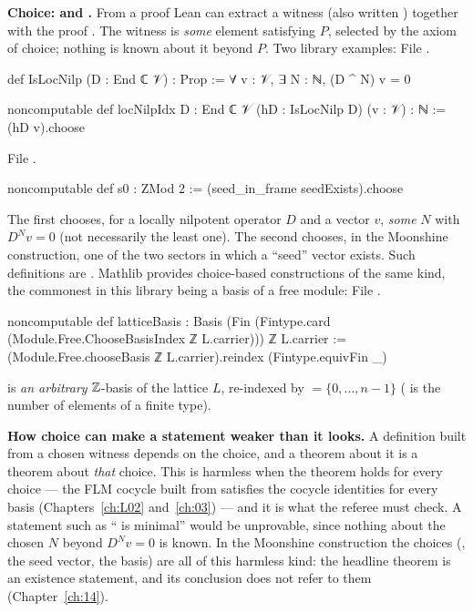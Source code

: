 \textbf{Choice:  and .} From a proof 
Lean can extract a witness  (also written ) together with
the proof . The witness is \emph{some} element satisfying $P$,
selected by the axiom of choice; nothing is known about it beyond $P$. Two library examples:
\noindent File .
\begin{leancode}
def IsLocNilp (D : End ℂ 𝒱) : Prop := ∀ v : 𝒱, ∃ N : ℕ, (D ^ N) v = 0

noncomputable def locNilpIdx {D : End ℂ 𝒱} (hD : IsLocNilp D) (v : 𝒱) : ℕ := (hD v).choose
\end{leancode}
\noindent File .
\begin{leancode}
noncomputable def s0 : ZMod 2 := (seed_in_frame seedExists).choose
\end{leancode}
The first chooses, for a locally nilpotent operator $D$ and a vector $v$, \emph{some} $N$ with
$D^Nv = 0$ (not necessarily the least one). The second chooses, in the Moonshine construction, one of
the two sectors in which a ``seed'' vector exists. Such definitions are . Mathlib
provides choice-based constructions of the same kind, the commonest in this library being a basis of
a free module:
\noindent File .
\begin{leancode}
noncomputable def latticeBasis :
    Basis (Fin (Fintype.card (Module.Free.ChooseBasisIndex ℤ L.carrier))) ℤ L.carrier :=
  (Module.Free.chooseBasis ℤ L.carrier).reindex (Fintype.equivFin _)
\end{leancode}
 is \emph{an arbitrary} ${\mathbb{Z}}$-basis of the lattice $L$,
re-indexed by  $=\{0,\dots,n-1\}$ ( is the number of elements of a
finite type).

\begin{warning}
\textbf{How choice can make a statement weaker than it looks.} A definition built from a chosen
witness depends on the choice, and a theorem about it is a theorem about \emph{that} choice. This is
harmless when the theorem holds for every choice --- the FLM cocycle built from
 satisfies the cocycle identities for every basis (Chapters~\ref{ch:L02}
and~\ref{ch:03}) --- and it is what the referee must check. A statement such as ``
is minimal'' would be unprovable, since nothing about the chosen $N$ beyond $D^Nv = 0$ is known. In
the Moonshine construction the choices (, the seed vector, the basis) are all of this
harmless kind: the headline theorem is an existence statement, and its conclusion does not refer to
them (Chapter~\ref{ch:14}).
\end{warning}


